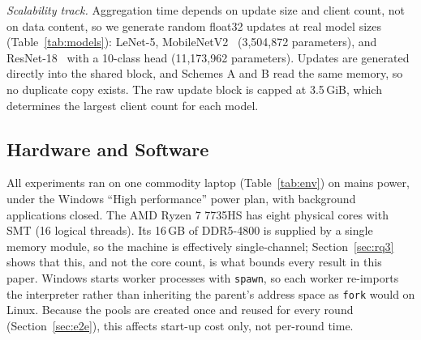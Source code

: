 \documentclass[conference]{IEEEtran}
\begin{document}
\textit{Scalability track.} Aggregation time depends on update size and client count, not on data content, so we generate random float32 updates at real model sizes (Table~\ref{tab:models}): LeNet-5, MobileNetV2~\cite{mobilenetv2} (3,504,872 parameters), and ResNet-18~\cite{resnet} with a 10-class head (11,173,962 parameters). Updates are generated directly into the shared block, and Schemes A and B read the same memory, so no duplicate copy exists. The raw update block is capped at 3.5\,GiB, which determines the largest client count for each model.

\begin{table}[t]
\caption{Model Sizes and Client Counts}
\label{tab:models}
\centering
\footnotesize
\setlength{\tabcolsep}{3.5pt}
\end{table}

\subsection{Hardware and Software}
All experiments ran on one commodity laptop (Table~\ref{tab:env}) on mains power, under the Windows ``High performance'' power plan, with background applications closed. The AMD Ryzen 7 7735HS has eight physical cores with SMT (16 logical threads). Its 16\,GB of DDR5-4800 is supplied by a single memory module, so the machine is effectively single-channel; Section~\ref{sec:rq3} shows that this, and not the core count, is what bounds every result in this paper. Windows starts worker processes with \texttt{spawn}, so each worker re-imports the interpreter rather than inheriting the parent's address space as \texttt{fork} would on Linux. Because the pools are created once and reused for every round (Section~\ref{sec:e2e}), this affects start-up cost only, not per-round time.
\end{document}

